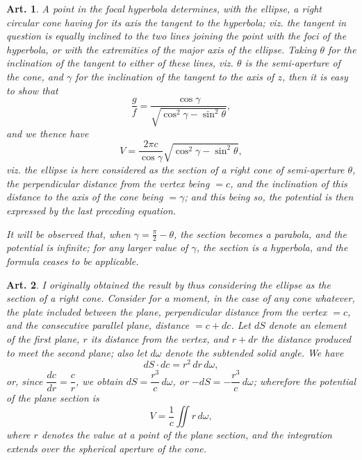 \documentclass[12pt,a4paper]{article}
\theoremstyle{cayley}
\newtheorem{art}{Art.}[section]
\begin{document}
\begin{art}
A point in the focal hyperbola determines, with the ellipse, a right circular cone having for its axis the tangent to the hyperbola; viz. the tangent in question is equally inclined to the two lines joining the point with the foci of the hyperbola, or with the extremities of the major axis of the ellipse. Taking $\theta$ for the inclination of the tangent to either of these lines, viz. $\theta$ is the semi-aperture of the cone, and $\gamma$ for the inclination of the tangent to the axis of $z$, then it is easy to show that
\[
\frac{g}{f} = \frac{\cos\gamma}{\sqrt{\cos^2\gamma - \sin^2\theta}},
\]
and we thence have
\[
V = \frac{2\pi c}{\cos\gamma}\sqrt{\cos^2\gamma - \sin^2\theta},
\]
viz. the ellipse is here considered as the section of a right cone of semi-aperture $\theta$, the perpendicular distance from the vertex being $=c$, and the inclination of this distance to the axis of the cone being $=\gamma$; and this being so, the potential is then expressed by the last preceding equation.

It will be observed that, when $\gamma = \frac{\pi}{2} - \theta$, the section becomes a parabola, and the potential is infinite; for any larger value of $\gamma$, the section is a hyperbola, and the formula ceases to be applicable.
\end{art}

\begin{art}
I originally obtained the result by thus considering the ellipse as the section of a right cone. Consider for a moment, in the case of any cone whatever, the plate included between the plane, perpendicular distance from the vertex $=c$, and the consecutive parallel plane, distance $=c+dc$. Let $dS$ denote an element of the first plane, $r$ its distance from the vertex, and $r + dr$ the distance produced to meet the second plane; also let $d\omega$ denote the subtended solid angle. We have
\[ dS \cdot dc = r^2\,dr\,d\omega, \]
or, since $\dfrac{dc}{dr} = \dfrac{c}{r}$, we obtain $dS = \dfrac{r^3}{c}\,d\omega$, or $-dS = -\dfrac{r^3}{c}\,d\omega$; wherefore the potential of the plane section is
\[
V = \frac{1}{c}\iint r\,d\omega,
\]
where $r$ denotes the value at a point of the plane section, and the integration extends over the spherical aperture of the cone.
\end{art}
\end{document}

